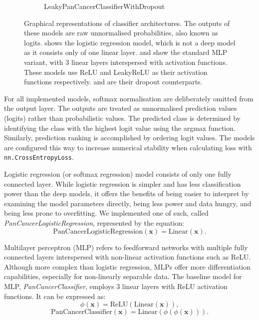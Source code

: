 \documentclass{l4proj}
\begin{document}
\begin{figure}[]
\begin{subfigure}[b]{0.3\textwidth}
        \caption{LeakyPanCancerClassifierWithDropout}
        \label{fig:leakypancancerclassifierdropout}
    \end{subfigure}
    \caption{Graphical representations of classifier architectures. The outputs of these models are raw unnormalised probabilities, also known as logits.  shows the logistic regression model, which is not a deep model as it consists only of one linear layer.  and  show the standard MLP variant, with 3 linear layers interspersed with activation functions. These models use ReLU and LeakyReLU as their activation functions respectively.  and  are their dropout counterparts.
    }\label{fig:classifiers}
\end{figure}

For all implemented models, softmax normalisation are deliberately omitted from the output layer. The outputs are treated as unnormalised prediction values (logits) rather than probabilistic values. The predicted class is determined by identifying the class with the highest logit value using the argmax function. Similarly, prediction ranking is accomplished by ordering logit values. The models are configured this way to increase numerical stability when calculating loss with \verb|nn.CrossEntropyLoss|.

Logistic regression (or softmax regression) model consists of only one fully connected layer. While logistic regression is simpler and has less classification power than the deep models, it offers the benefits of being easier to interpret by examining the model parameters directly, being less power and data hungry, and being less prone to overfitting. We implemented one of such, called \emph{PanCancerLogisticRegression}, represented by the equation:
\begin{equation}
    \text{PanCancerLogisticRegression}(\boldsymbol{x}) = \text{Linear}(\boldsymbol{x}).
\end{equation}

Multilayer perceptron (MLP) refers to feedforward networks with multiple fully connected layers interspersed with non-linear activation functions such as ReLU. Although more complex than logistic regression, MLPs offer more differentiation capabilities, especially for non-linearly separable data. The baseline model for MLP, \emph{PanCancerClassifier}, employs 3 linear layers with ReLU activation functions. It can be expressed as:
\begin{equation}
    \phi(\boldsymbol{x}) = \text{ReLU}(\text{Linear}(\boldsymbol{x})),
\end{equation}
\begin{equation}
    \text{PanCancerClassifier}(\boldsymbol{x}) = \text{Linear}(\phi(\phi(\boldsymbol{x}))).
\end{equation}
\end{document}

